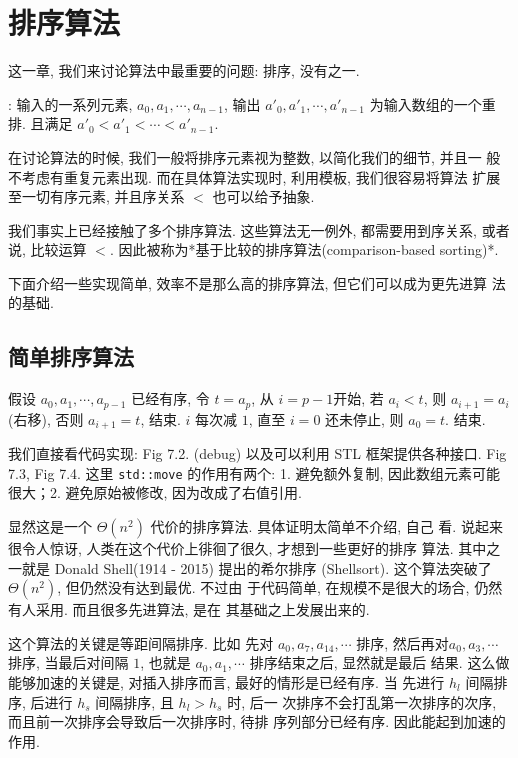 \documentclass[a4paper]{ctexart}
\theoremstyle{definition}
\theoremstyle{definition}
\begin{document}

\section{排序算法}

这一章, 我们来讨论算法中最重要的问题: 排序, 没有之一. 

 : 输入的一系列元素, $a_0, a_1, \cdots,
a_{n - 1}$, 输出 $a'_0, a'_1, \cdots, a'_{n - 1}$ 为输入数组的一个重排.
且满足 $a'_0 < a'_1 < \cdots < a'_{n - 1}$.

在讨论算法的时候, 我们一般将排序元素视为整数, 以简化我们的细节, 并且一
般不考虑有重复元素出现. 而在具体算法实现时, 利用模板, 我们很容易将算法
扩展至一切有序元素, 并且序关系 $<$ 也可以给予抽象.

我们事实上已经接触了多个排序算法. 这些算法无一例外, 都需要用到序关系,
或者说, 比较运算 $<$. 因此被称为*基于比较的排序算法(comparison-based
sorting)*.

下面介绍一些实现简单, 效率不是那么高的排序算法, 但它们可以成为更先进算
法的基础.

\subsection{简单排序算法}

 假设 $a_0, a_1, \cdots, a_{p - 1}$
已经有序, 令 $t = a_{p}$, 从 $i = p - 1$开始, 若 $a_i < t$, 则 $a_{i +
  1} = a_i$(右移), 否则 $a_{i + 1} = t$, 结束.  $i$ 每次减 $1$, 直至 $i = 0$
还未停止, 则 $a_0 = t$. 结束.

我们直接看代码实现: Fig 7.2. (debug) 以及可以利用 STL 框架提供各种接口.
Fig 7.3, Fig 7.4. 这里 \verb|std::move| 的作用有两个: 1. 避免额外复制,
因此数组元素可能很大；2. 避免原始被修改, 因为改成了右值引用. 

显然这是一个 $\Theta(n^2)$ 代价的排序算法. 具体证明太简单不介绍, 自己
看. 说起来很令人惊讶, 人类在这个代价上徘徊了很久, 才想到一些更好的排序
算法. 其中之一就是 Donald Shell(1914 - 2015) 提出的希尔排序
(Shellsort). 这个算法突破了 $\Theta(n^2)$, 但仍然没有达到最优. 不过由
于代码简单, 在规模不是很大的场合, 仍然有人采用. 而且很多先进算法, 是在
其基础之上发展出来的.

 这个算法的关键是等距间隔排序. 比如
先对 $a_0, a_7, a_{14}, \cdots$ 排序, 然后再对$a_0, a_3, \cdots$ 排序,
当最后对间隔 $1$, 也就是 $a_0, a_1, \cdots$ 排序结束之后, 显然就是最后
结果. 这么做能够加速的关键是, 对插入排序而言, 最好的情形是已经有序. 当
先进行 $h_l$ 间隔排序, 后进行 $h_s$ 间隔排序, 且 $h_l > h_s$ 时, 后一
次排序不会打乱第一次排序的次序, 而且前一次排序会导致后一次排序时, 待排
序列部分已经有序. 因此能起到加速的作用.
\end{document}
